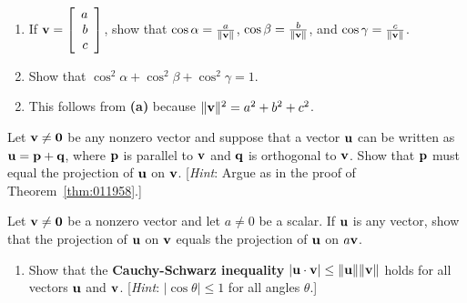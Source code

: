 \begin{multicols}{2}
\begin{ex}
\begin{enumerate}[label={\alph*.}]
\item If $\textbf{v} = \left[
\begin{array}{r}
a\\
b\\
c
\end{array}
\right]$, show that $\cos\alpha = \tfrac{a}{\| \textbf{v} \|}$, $\cos\beta = \tfrac{b}{\| \textbf{v} \|}$, and $\cos\gamma= \tfrac{c}{\| \textbf{v} \|}$.

\item Show that $\cos^{2} \alpha + \cos^2 \beta + \cos^2 \gamma = 1$.

\end{enumerate}
\begin{sol}
\begin{enumerate}[label={\alph*.}]
\setcounter{enumi}{1}
\item  This follows from \textbf{(a)} because $\|\textbf{v}\|^{2} = a^{2} + b^{2} + c^{2}$.

\end{enumerate}
\end{sol}
\end{ex}

\begin{ex}
Let $\textbf{v} \neq \textbf{0}$ be any nonzero vector and suppose that a vector $\textbf{u}$ can be written as $\textbf{u} = \textbf{p} + \textbf{q}$, where $\textbf{p}$ is parallel to $\textbf{v}$ and $\textbf{q}$ is orthogonal to $\textbf{v}$. Show that $\textbf{p}$ must equal the projection of $\textbf{u}$ on $\textbf{v}$. [\textit{Hint}: Argue as in the proof of Theorem~\ref{thm:011958}.]
\end{ex}

\begin{ex}
Let $\textbf{v} \neq \textbf{0}$ be a nonzero vector and let $a \neq 0$ be a scalar. If $\textbf{u}$ is any vector, show that the projection of $\textbf{u}$ on $\textbf{v}$ equals the projection of $\textbf{u}$ on $a\textbf{v}$.
\end{ex}

\begin{ex}
\begin{enumerate}[label={\alph*.}]
\item Show that the \textbf{Cauchy-Schwarz inequality} $|\textbf{u} \cdot \textbf{v}| \leq \|\textbf{u}\|\|\textbf{v}\|$ holds for all vectors $\textbf{u}$ and $\textbf{v}$. [\textit{Hint}: $|\cos \theta| \leq 1$ for all angles $\theta$.]


\end{enumerate}
\end{ex}
\end{multicols}
